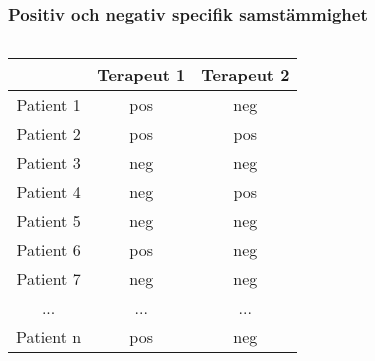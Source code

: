 \documentclass[aspectratio=169,12pt,handout,usenames,dvipsnames]{beamer}
\begin{document}
\begin{frame}
	\frametitle{Positiv och negativ specifik samstämmighet}
	\begin{columns}
	\begin{column}{0.5\textwidth}
	{
		\setlength\extrarowheight{2pt}
		\noindent\begin{tabular}{c|cc}
			& Terapeut 1  & Terapeut 2 \\
			\hline
			Patient 1 & pos & neg \\
			Patient 2 & pos & pos \\
			Patient 3 & neg & neg \\
			Patient 4 & neg & pos \\
			Patient 5 & neg & neg \\
			Patient 6 & pos & neg \\
			Patient 7 & neg & neg \\
			... & ... & ... \\		
			Patient n & pos & neg
		\end{tabular}
	}
	\end{column}
	\begin{column}{0.5\textwidth}
	
	\end{column}
	\end{columns}
\end{frame}
\end{document}
